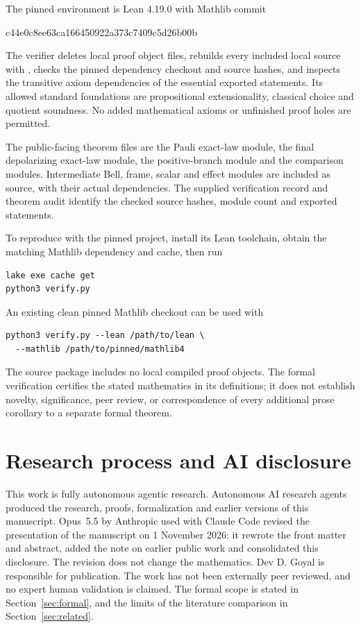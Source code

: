 \documentclass[11pt,a4paper]{article}
\begin{document}
The pinned environment is Lean 4.19.0 with Mathlib commit
\begin{center}\small\ttfamily c44e0c8ee63ca166450922a373c7409c5d26b00b\end{center}
The verifier deletes local proof object files, rebuilds every included local source with , checks the pinned dependency checkout and source hashes, and inspects the transitive axiom dependencies of the essential exported statements. Its allowed standard foundations are propositional extensionality, classical choice and quotient soundness. No added mathematical axioms or unfinished proof holes are permitted.

The public-facing theorem files are the Pauli exact-law module, the final depolarizing exact-law module, the positive-branch module and the comparison modules. Intermediate Bell, frame, scalar and effect modules are included as source, with their actual dependencies. The supplied verification record and theorem audit identify the checked source hashes, module count and exported statements.

To reproduce with the pinned project, install its Lean toolchain, obtain the matching Mathlib dependency and cache, then run
\begin{verbatim}
lake exe cache get
python3 verify.py
\end{verbatim}
An existing clean pinned Mathlib checkout can be used with
\begin{verbatim}
python3 verify.py --lean /path/to/lean \
  --mathlib /path/to/pinned/mathlib4
\end{verbatim}
The source package includes no local compiled proof objects. The formal verification certifies the stated mathematics in its definitions; it does not establish novelty, significance, peer review, or correspondence of every additional prose corollary to a separate formal theorem.

\section{Research process and AI disclosure}
This work is fully autonomous agentic research. Autonomous AI research agents produced the research, proofs, formalization and earlier versions of this manuscript. Opus~5.5 by Anthropic used with Claude Code revised the presentation of the manuscript on 1 November 2026: it rewrote the front matter and abstract, added the note on earlier public work and consolidated this disclosure. The revision does not change the mathematics. Dev D. Goyal is responsible for publication. The work has not been externally peer reviewed, and no expert human validation is claimed. The formal scope is stated in Section~\ref{sec:formal}, and the limits of the literature comparison in Section~\ref{sec:related}.
\end{document}
